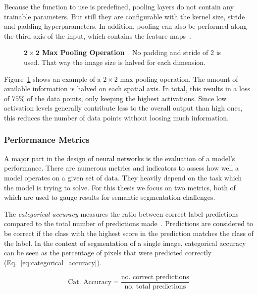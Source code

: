 Because the function to use is predefined, pooling layers do not contain any trainable parameters. But still they are configurable with the kernel size, stride and padding hyperparameters. In addition, pooling can also be performed along the third axis of the input, which contains the feature maps~\cite[p.~370]{praxiseinstieg_ml17}.

\begin{figure}[h]
    \centering
    
    \caption[$2\times 2$ Max Pooling Operation]
    {\textbf{$\mathbf{2\times 2}$ Max Pooling Operation}~\cite[modified]{stanford_convnet}. No padding and stride of 2 is used. That way the image size is halved for each dimension.}
    \label{fig:pooling}
\end{figure}

Figure~\ref{fig:pooling} shows an example of a $2\times 2$ max pooling operation. The amount of available information is halved on each spatial axis. In total, this results in a loss of $75\%$ of the data points, only keeping the highest activations. Since low activation levels generally contribute less to the overall output than high ones, this reduces the number of data points without loosing much information.

\subsubsection{Performance Metrics}
\label{sec:metrics}
A major part in the design of neural networks is the evaluation of a model's performance. There are numerous metrics and indicators to assess how well a model operates on a given set of data. They heavily depend on the task which the model is trying to solve. For this thesis we focus on two metrics, both of which are used to gauge results for semantic segmentation challenges.

The \emph{categorical accuracy} measures the ratio between correct label predictions compared to the total number of predictions made~\cite{tf_whitepaper15}. Predictions are considered to be correct if the class with the highest score in the prediction matches the class of the label. In the context of segmentation of a single image, categorical accuracy can be seen as the percentage of pixels that were predicted correctly (Eq.~\ref{eq:categorical_accuracy}).

\begin{equation}
    \label{eq:categorical_accuracy}
    \text{Cat.\ Accuracy} = \frac{\text{no.\ correct predictions}}{\text{no.\ total predictions}}
\end{equation}

